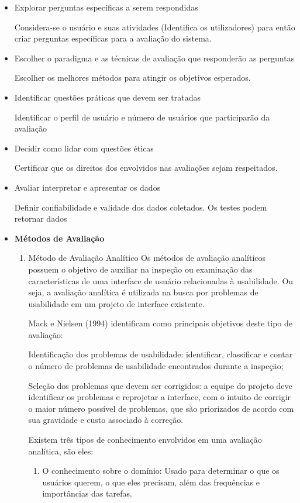 \begin{enumerate}
\begin{itemize}
\item Explorar perguntas específicas a serem respondidas
		
Considera-se o usuário e suas atividades (Identifica os utilizadores) para então criar perguntas específicas para a avaliação do sistema.

\item Escolher o paradigma e as técnicas de avaliação que responderão as perguntas
	
Escolher os melhores métodos para atingir os objetivos esperados.

\item Identificar questões práticas que devem ser tratadas

Identificar o perfil de usuário e número de usuários que participarão da avaliação

\item Decidir como lidar com questões éticas
	
Certificar que os direitos dos envolvidos nas avaliações sejam respeitados.

\item Avaliar interpretar e apresentar os dados

Definir confiabilidade e validade dos dados coletados. Os testes podem retornar dados

\item \textbf{Métodos de Avaliação}
\begin{enumerate}

\item Método de Avaliação Analítico
Os métodos de avaliação analíticos possuem o objetivo de auxiliar na inspeção ou examinação das características de uma interface de usuário relacionadas à usabilidade. Ou seja, a avaliação analítica é utilizada na busca por problemas de usabilidade em um projeto de interface existente.

Mack e Nielsen (1994) identificam como principais objetivos deste tipo de avaliação:

Identificação dos problemas de usabilidade: identificar, classificar e contar o número de problemas de usabilidade encontrados durante a inspeção;

Seleção dos problemas que devem ser corrigidos: a equipe do projeto deve identificar os problemas e reprojetar a interface, com o intuito de corrigir o maior número possível de problemas, que são priorizados de acordo com sua gravidade e custo associado à correção.

Existem três tipos de conhecimento envolvidos em uma avaliação analítica, são eles:
\begin{enumerate}
\item O conhecimento sobre o domínio: Usado para determinar o que os usuários querem, o que eles precisam, além das frequências e importâncias das tarefas.


\end{enumerate}
\end{enumerate}
\end{itemize}
\end{enumerate}
